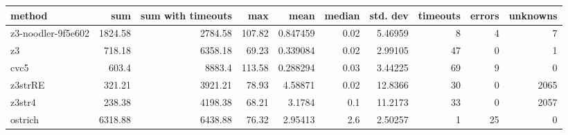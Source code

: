 \begin{tabular}{lrrrrrrrrr}
\hline
 method             &     sum &   sum with timeouts &    max &     mean &   median &   std. dev &   timeouts &   errors &   unknowns \\
\hline
 z3-noodler-9f5e602 & 1824.58 &             2784.58 & 107.82 & 0.847459 &     0.02 &    5.46959 &          8 &        4 &          7 \\
 z3                 &  718.18 &             6358.18 &  69.23 & 0.339084 &     0.02 &    2.99105 &         47 &        0 &          1 \\
 cvc5               &  603.4  &             8883.4  & 113.58 & 0.288294 &     0.03 &    3.44225 &         69 &        9 &          0 \\
 z3strRE            &  321.21 &             3921.21 &  78.93 & 4.58871  &     0.02 &   12.8366  &         30 &        0 &       2065 \\
 z3str4             &  238.38 &             4198.38 &  68.21 & 3.1784   &     0.1  &   11.2173  &         33 &        0 &       2057 \\
 ostrich            & 6318.88 &             6438.88 &  76.32 & 2.95413  &     2.6  &    2.50257 &          1 &       25 &          0 \\
\hline
\end{tabular}
